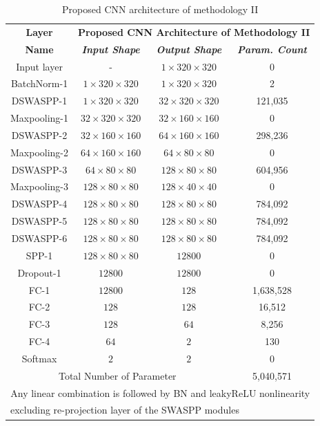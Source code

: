 \renewcommand{\arraystretch}{1.5}
\begin{table}[htbp]
    \caption{Proposed CNN architecture of methodology II}
    \begin{center}
    \begin{tabular}{|c|c|c|c|}
    \hline
    \textbf{Layer}&\multicolumn{3}{|c|}{\textbf{Proposed CNN Architecture of Methodology II}} \\
    \cline{2-4} 
    \textbf{Name} & \textbf{\textit{Input Shape}}& \textbf{\textit{Output Shape}}& \textbf{\textit{Param. Count}} \\
    \hline
    Input layer & - & $1 \times 320 \times 320$ & 0 \\
    \hline
    BatchNorm-1 & $1 \times 320 \times 320$ & $1 \times 320 \times 320$ & 2 \\
    \hline
    DSWASPP-1& $1 \times 320 \times 320$ & $32 \times 320 \times 320$ & 121,035  \\
    \hline
    Maxpooling-1& $32 \times 320 \times 320$ &$32 \times 160 \times 160$ & 0 \\
    \hline
    DSWASPP-2& $32 \times 160 \times 160$ & $64 \times 160 \times 160$ & 298,236  \\
    \hline
    Maxpooling-2 & $64 \times 160 \times 160$ & $64 \times 80 \times 80$ &0  \\
    \hline
    DSWASPP-3  & $64 \times 80 \times 80$ & $128 \times 80 \times 80$ & 604,956  \\
    \hline
    Maxpooling-3 & $128 \times 80 \times 80$ & $128 \times 40 \times 40$ & 0  \\
    \hline
    DSWASPP-4  & $128 \times 80 \times 80$ & $128 \times 80 \times 80$ & 784,092 \\
    \hline
    DSWASPP-5  & $128 \times 80 \times 80$ & $128 \times 80 \times 80$ & 784,092 \\
    \hline
    DSWASPP-6  & $128 \times 80 \times 80$ & $128 \times 80 \times 80$ & 784,092 \\
    \hline
    SPP-1 & $128 \times 80 \times 80$ & $12800$ & 0 \\
    \hline
    Dropout-1 & $12800$ & $12800$ & 0 \\
    \hline
    FC-1 & $12800$ & $128$ & 1,638,528 \\
    \hline
    FC-2 & $128$ & $128$ & 16,512 \\
    \hline
    FC-3 & $128$ & $64$ & 8,256 \\
    \hline
    FC-4 & $64$ & $2$ & 130 \\
    \hline
    Softmax & $2$ & $2$ & 0 \\
    \hline
    \hline
    \multicolumn{3}{|c|}{Total Number of Parameter}&5,040,571\\
    \hline
    \multicolumn{4}{c}{Any linear combination is followed by BN and leakyReLU nonlinearity}\\
    \multicolumn{4}{l}{excluding re-projection layer of the SWASPP modules}
    \end{tabular}
    \label{PCNN}
    \end{center}
    \end{table}


